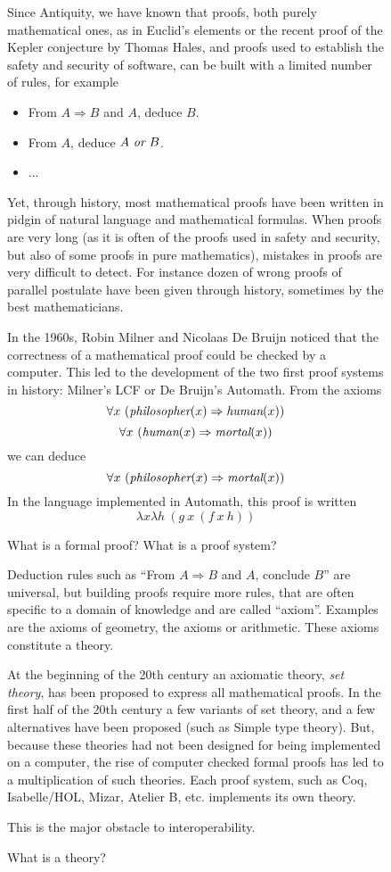 \begin{figure}
\begin{framed}
Since Antiquity, we have known that
proofs, both purely mathematical ones, as in Euclid's elements or the
recent proof of the Kepler conjecture by Thomas Hales, and proofs used
to establish the safety and security of software, can be built with a
limited number of rules, for example
\begin{itemize}
\item From $A \Rightarrow B$ and $A$, deduce $B$.
\item From $A$, deduce $A~\mbox{\it or}~B$.
\item ...
\end{itemize}
Yet, through history, most mathematical proofs have been written in
pidgin of natural language and mathematical formulas. When proofs are
very long (as it is often of the proofs used in safety and security,
but also of some proofs in pure mathematics), mistakes in proofs are
very difficult to detect. For instance dozen of wrong proofs of
parallel postulate have been given through history, sometimes by the
best mathematicians.

In the 1960s, Robin Milner and Nicolaas De Bruijn noticed that the
correctness of a mathematical proof could be checked by a
computer. This led to the development of the two first proof systems
in history: Milner's {\sc LCF} or De Bruijn's {\sc Automath}.  From
the axioms
$$\forall x~(\mbox{\em philosopher}(x) \Rightarrow \mbox{\em human}(x))$$
$$\forall x~(\mbox{\em human}(x) \Rightarrow \mbox{\em mortal}(x))$$
we can deduce
$$\forall x~(\mbox{\em philosopher}(x) \Rightarrow \mbox{\em mortal}(x))$$
In the language implemented in {\sc Automath}, this proof is written
$$\lambda x \lambda h~(g~x~(f~x~h))$$

\caption{What is a formal proof? What is a proof system?\label{formal}}
\end{framed}
\end{figure}

\begin{figure}
\begin{framed}
Deduction rules such as ``From $A \Rightarrow B$ and $A$, conclude
$B$'' are universal, but building proofs require more rules, that are
often specific to a domain of knowledge and are called
``axiom''. Examples are the axioms of geometry, the axioms or
arithmetic. These axioms constitute a theory.

At the beginning of the 20th century an axiomatic theory, {\em set
  theory}, has been proposed to express all mathematical proofs. In
the first half of the 20th century a few variants of set theory, and a
few alternatives have been proposed (such as Simple type theory).
But, because these theories had not been designed for being
implemented on a computer, the rise of computer checked formal proofs
has led to a multiplication of such theories. Each proof system,
such as {\sc Coq}, {\sc Isabelle/HOL}, {\sc Mizar}, {\sc Atelier B},
etc. implements its own theory.

This is the major obstacle to interoperability.
\caption{What is a theory?\label{theory}}
\end{framed}
\end{figure}

